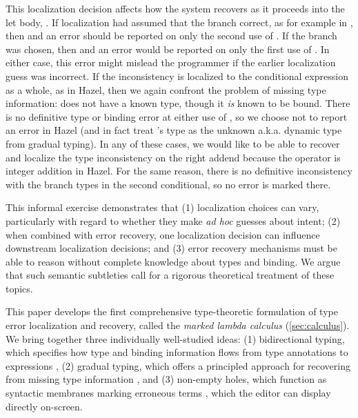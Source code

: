 This localization decision affects how the system recovers as it proceeds into the let body, . 
If localization had assumed that the  branch correct, as for example in , then 
 and an error should be reported on only the second use of . 
If the  branch was chosen, then  and an error would be reported on only the first use of . 
 In either case, this error might mislead the programmer if the earlier localization guess was incorrect.
If the inconsistency is localized to the conditional expression as a whole, as in Hazel, then we again confront the problem of missing type information: 
 does not have a known type,
though it \emph{is} known to be bound. 
There is no definitive type or binding error at either use of , 
so we choose not to report an error in Hazel (and in fact treat 's type as the unknown a.k.a. dynamic type from gradual typing).
In any of these cases, we would like to be able to recover and 
localize the type inconsistency on the right addend because the \li{+} operator is integer addition in Hazel.
For the same reason, there is no definitive inconsistency with the branch types in the second conditional, so no 
error is marked there.

This informal exercise demonstrates that (1) localization choices can vary, particularly with regard to whether they make \emph{ad hoc} guesses about intent;  
(2) when combined with error recovery, one localization decision can influence downstream localization decisions; and 
(3) error recovery mechanisms must be able to reason without complete knowledge about types and binding. We argue that such semantic subtleties call for a rigorous theoretical treatment of these topics.

This paper develops the first comprehensive {type-theoretic formulation} of type error localization and recovery, called the \emph{marked lambda calculus} (\cref{sec:calculus}).
We bring together three individually well-studied ideas: (1) bidirectional typing, which specifies how type and binding information flows from 
type annotations to expressions \cite{Localinf,BidirTyping}, (2) gradual typing, which offers a principled approach for recovering from missing type information \cite{Siek06a,siek2015refined}, and 
(3) non-empty holes, which function as syntactic membranes marking erroneous terms \cite{HazelnutPOPL}, which the editor can display directly on-screen.

